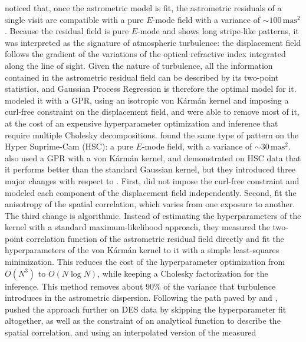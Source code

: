  noticed that, once the astrometric model is fit, the astrometric residuals of a single visit are compatible with a 
pure $E$-mode field with a variance of ${\sim}100\,\mathrm{mas}^2$.
Because the residual field is pure $E$-mode and shows long stripe-like patterns, it was interpreted as the signature of 
atmospheric turbulence: the displacement field follows the gradient of the variations of the optical refractive index 
integrated along the line of sight.
Given the nature of turbulence, all the information contained in the astrometric residual field can be described by its 
two-point statistics, and Gaussian Process Regression \citep[GPR;][]{rasmussen2006} is therefore the optimal model for it.
\citet[hereafter F21]{2021AJ....162..106F} modeled it with a GPR, using an isotropic von K\'arm\'an kernel and imposing a 
curl-free constraint on the displacement field, and were able to remove most of it, at the cost of an expensive hyperparameter 
optimization and inference that require multiple Cholesky decompositions.
\citet[hereafter L21]{2021A&A...650A..81L} found the same type of pattern on the Hyper Suprime-Cam (HSC): a pure $E$-mode field, 
with a variance of ${\sim}30\,\mathrm{mas}^2$.
 also used a GPR with a von K\'arm\'an kernel, and demonstrated on HSC data that it performs better than the standard 
Gaussian kernel, but they introduced three major changes with respect to .
First,  did not impose the curl-free constraint and modeled each component of the displacement field independently.
Second,  fit the anisotropy of the spatial correlation, which varies from one exposure to another.
The third change is algorithmic.
Instead of estimating the hyperparameters of the kernel with a standard maximum-likelihood approach, they measured the 
two-point correlation function of the astrometric residual field directly and fit the hyperparameters of the von K\'arm\'an kernel to 
it with a simple least-squares minimization.
This reduces the cost of the hyperparameter optimization from $O(N^3)$ to $O(N \log N)$, while keeping a Cholesky factorization for the inference.
This method removes about 90\% of the variance that turbulence introduces in the astrometric dispersion.
Following the path paved by  and , \citet[hereafter G25]{2025AJ....170..361G} pushed the approach further on DES data 
by skipping the hyperparameter fit altogether, as well as the constraint of an analytical function to describe the spatial correlation, and using an interpolated version of the measured 
